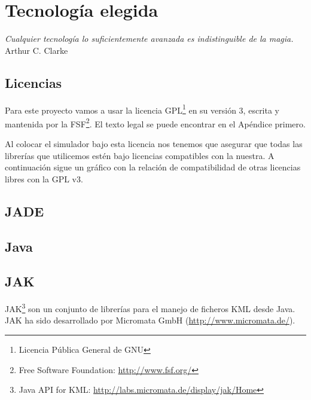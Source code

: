 
\chapter*{Tecnología elegida} \label{cap4}


\begin{flushright}
\begin{minipage}{7.85cm}
    {\em Cualquier tecnología lo suficientemente avanzada es indistinguible de
    la magia.} \\ Arthur C. Clarke
\end{minipage}
\end{flushright}

\vspace*{5mm}

\section*{Licencias}

Para este proyecto vamos a usar la licencia GPL\footnote{Licencia Pública
General de GNU} en su versión 3, escrita y mantenida por la FSF\footnote{Free
Software Foundation: \url{http://www.fsf.org/}}. El texto legal se puede
encontrar en el Apéndice primero. %

Al colocar el simulador bajo esta licencia nos tenemos que asegurar que todas
las librerías que utilicemos estén bajo licencias compatibles con la nuestra. A
continuación sigue un gráfico con la relación de compatibilidad de otras
licencias libres con la GPL v3.


\section*{JADE}

\section*{Java}

\section*{JAK}

JAK\footnote{Java API for KML: \url{http://labs.micromata.de/display/jak/Home}}
son un conjunto de librerías para el manejo de ficheros KML desde Java. JAK ha
sido desarrollado por Micromata GmbH (\url{http://www.micromata.de/}).

